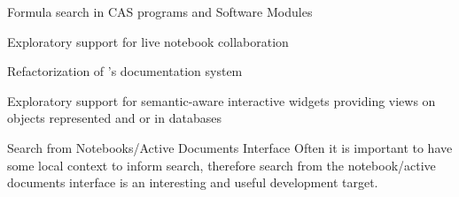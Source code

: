 \begin{workpackage}
\begin{wpdelivs}
   \begin{wpdeliv}[id=cassearch,due=30,nature=OTHER,dissem=PU,lead=JU]
      {Formula search in CAS programs and Software Modules}
    \end{wpdeliv}
  \begin{wpdeliv}[due=36,id=jupyter-live-collab,dissem=PU,nature=OTHER,lead=SR]
      {Exploratory support for live notebook collaboration}
  \end{wpdeliv}
  \begin{wpdeliv}[due=24,id=sage-sphinx,dissem=PU,nature=OTHER,lead=PS]
      {Refactorization of \Sage's \Sphinx documentation system}
  \end{wpdeliv}
  \begin{wpdeliv}[due=36,id=ipython-advanced-interacts,dissem=PU,nature=DEM,lead=PS]
      {Exploratory support for semantic-aware interactive widgets providing views on objects
      represented and or in databases}
  \end{wpdeliv}
\begin{wpdeliv}[id=nbad-search,due=42,nature=OTHER,dissem=PU,lead=JU]
  {Search from Notebooks/Active Documents Interface} Often it is important to have some
  local context to inform search, therefore search from the notebook/active documents
  interface is an interesting and useful development target.
\end{wpdeliv}


  \end{wpdelivs}
\end{workpackage}

